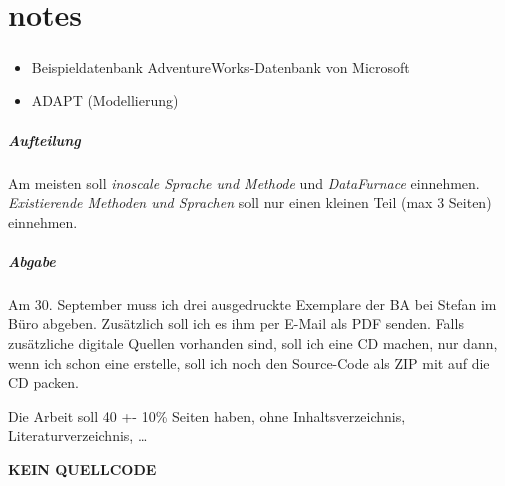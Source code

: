 \chapter{notes}
\paragraph{}
\begin{itemize}
  \item Beispieldatenbank AdventureWorks-Datenbank von Microsoft
  \item ADAPT (Modellierung)
\end{itemize}

\paragraph{Aufteilung}
Am meisten soll \textit{inoscale Sprache und Methode} und \textit{DataFurnace} einnehmen. \textit{Existierende Methoden und Sprachen} soll nur einen kleinen Teil (max 3 Seiten) einnehmen.

\paragraph{Abgabe}
Am 30. September muss ich drei ausgedruckte Exemplare der BA bei Stefan im Büro
abgeben. Zusätzlich soll ich es ihm per E-Mail als PDF senden. Falls
zusätzliche digitale Quellen vorhanden sind, soll ich eine CD machen, nur dann,
wenn ich schon eine erstelle, soll ich noch den Source-Code als ZIP mit auf die
CD packen.

Die Arbeit soll 40 +- 10\% Seiten haben, ohne Inhaltsverzeichnis, Literaturverzeichnis, \ldots


\textbf{KEIN QUELLCODE}
